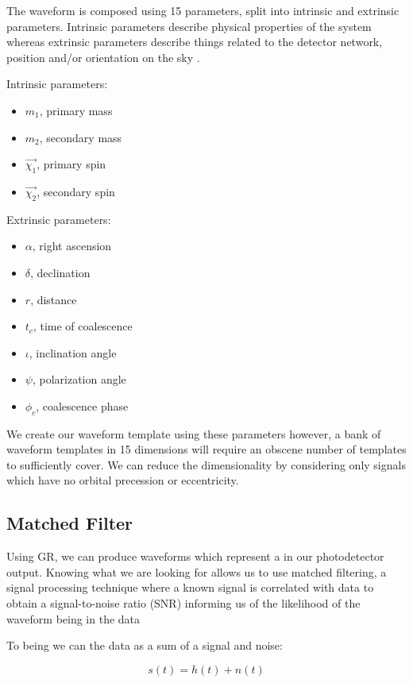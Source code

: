 The waveform is composed using 15 parameters, split into intrinsic and extrinsic parameters. Intrinsic parameters describe physical properties of the system whereas extrinsic parameters describe things related to the detector network, position and/or orientation on the sky \cite{BAYEstar}.

Intrinsic parameters:
\begin{itemize}
   \item $m_1$, primary mass
   \item $m_2$, secondary mass
   \item $\vec{\chi_1}$, primary spin
   \item $\vec{\chi_2}$, secondary spin
\end{itemize}

Extrinsic parameters:
\begin{itemize}
   \item $\alpha$, right ascension
   \item $\delta$, declination
   \item $r$, distance
   \item $t_c$, time of coalescence
   \item $\iota$, inclination angle
   \item $\psi$, polarization angle
   \item $\phi_c$, coalescence phase
\end{itemize}

We create our waveform template using these parameters however, a bank of waveform templates in 15 dimensions will require an obscene number of templates to sufficiently cover. We can reduce the dimensionality by considering only signals which have no orbital precession or eccentricity. 

\subsection{\label{sec:matched-filter}Matched Filter}

Using GR, we can produce waveforms which represent a \gw in our photodetector output. Knowing what we are looking for allows us to use matched filtering, a signal processing technique where a known signal is correlated with data to
obtain a signal-to-noise ratio (SNR) informing us of the likelihood of the waveform being in the data

To being we can the data as a sum of a signal and noise:

\begin{equation}
   s(t) = h(t) + n(t)
   \label{eqn:s_h_n}
\end{equation}

